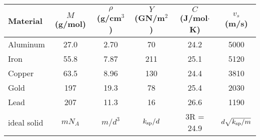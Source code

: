 \begin{tabular}{lccccc}
\hline\hline
Material & $M$ (g/mol) & $\rho$ (g/cm$^3$) & $Y$ (GN/m$^2$) & 
$C$ (J/mol$\cdot$K)  & $v_s$ (m/s) \\ \hline
Aluminum & 27.0 & 2.70 & 70  & 24.2  & 5000\\
Iron     & 55.8 & 7.87 & 211 & 25.1  & 5120\\
Copper   & 63.5 & 8.96 & 130 & 24.4  & 3810\\
Gold     & 197  & 19.3 & 78  & 25.4  & 2030\\
Lead     & 207  & 11.3 & 16  & 26.6  & 1190\\
ideal solid & $mN_A$ & $m/d^3$ & $k_{\rm sp}/d$ & 3R = 24.9  
                                          &  $d\sqrt{k_{\rm sp}/m}$\\
\hline\hline
\end{tabular}
